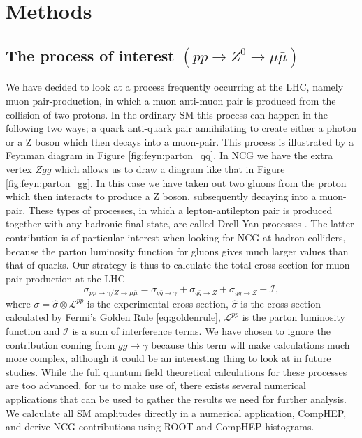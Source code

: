 \section{Methods}

\subsection{The process of interest $(pp \rightarrow Z^0 \rightarrow \mu \bar\mu)$}
We have decided to look at a process frequently occurring at the LHC, namely muon pair-production, in which a muon anti-muon pair is produced from the collision of two protons. In the ordinary SM this process can happen in the following two ways; a quark anti-quark pair annihilating to create either a photon or a Z boson which then decays into a muon-pair. This process is illustrated by a Feynman diagram in Figure \ref{fig:feyn:parton_qq}. In NCG we have the extra vertex $Zgg$ which allows us to draw a diagram like that in Figure \ref{fig:feyn:parton_gg}. In this case we have taken out two gluons from the proton which then interacts to produce a Z boson, subsequently decaying into a muon-pair. These types of processes, in which a lepton-antilepton pair is produced together with any hadronic final state, are called Drell-Yan processes \cite{burgess2007smp}. The latter contribution is of particular interest when looking for NCG at hadron colliders, because the parton luminosity function for gluons gives much larger values than that of quarks. Our strategy is thus to calculate the total cross section for muon pair-production at the LHC
\begin{equation}
	\sigma_{pp \rightarrow \gamma/ Z \rightarrow \mu \bar \mu} = \sigma_{q \bar q \rightarrow \gamma} + \sigma_{q \bar q \rightarrow Z} + \sigma_{gg \rightarrow Z} + \mathcal{I},
\end{equation}
where $\sigma =\hat \sigma \otimes \mathcal{L}^{pp}$ is the experimental cross section, $\hat \sigma$ is the cross section calculated by Fermi's Golden Rule \eqref{eq:goldenrule}, $\mathcal{L}^{pp}$ is the parton luminosity function and $\mathcal{I}$ is a sum of interference terms. We have chosen to ignore the contribution coming from $gg \rightarrow \gamma$ because this term will make calculations much more complex, although it could be an interesting thing to look at in future studies. While the full quantum field theoretical calculations for these processes are too advanced, for us to make use of, there exists several numerical applications that can be used to gather the results we need for further analysis. We calculate all SM amplitudes directly in a numerical application, CompHEP, and derive NCG contributions using ROOT and CompHEP histograms.

